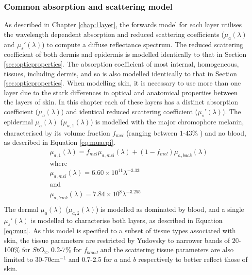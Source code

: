 \subsubsection{Common absorption and scattering model}\label{sec:opticproperties2}
As described in Chapter \ref{chap:1layer}, the forwards model for each layer utilises the wavelength dependent absorption and reduced scattering coefficients ($\mu_a(\lambda)$ and $\mu_s'(\lambda)$) to compute a diffuse reflectance spectrum. 
The reduced scattering coefficient of both dermis and epidermis is modelled identically to that in Section \ref{sec:opticproperties}. The absorption coefficient of most internal, homogeneous, tissues, including dermis, and so is also modelled identically to that in Section \ref{sec:opticproperties}. When modelling skin, it is necessary to use more than one layer due to the stark differences in optical and anatomical properties between the layers of skin\cite{Mignon2018}. In this chapter each of these layers has a distinct absorption coefficient ($\mu_a(\lambda)$) and identical reduced scattering coefficient ($\mu_s'(\lambda)$). The epidermal $\mu_a(\lambda)$ ($\mu_{a, 1}(\lambda)$) is modelled with the major chromophore melanin, characterised by its volume fraction $f_{mel}$ (ranging between 1-43\% \cite{Yudovsky2009}) and no blood, as described in Equation \ref{eq:muaepi}. 
\begin{equation}
\begin{aligned}
    & \mu_{a, 1}(\lambda) = f_{mel}\mu_{a, mel}(\lambda) + (1-f_{mel})\mu_{a, back}(\lambda) \\
    & \textrm{where}\\
    & \mu_{a, mel}(\lambda) = 6.60\times10^{11}\lambda^{-3.33}\\
    & \textrm{and}\\
    & \mu_{a, back}(\lambda) = 7.84\times10^8\lambda^{-3.255}\\
\end{aligned}
\label{eq:muaepi}
\end{equation}
The dermal $\mu_a(\lambda)$ ($\mu_{a, 2}(\lambda)$) is modelled as dominated by blood, and a single $\mu_s'(\lambda)$ is modelled to characterise both layers, as described in Equation \ref{eq:mua}. As this model is specified to a subset of tissue types associated with skin, the tissue parameters are restricted by Yudovsky to narrower bands of 20-100\% for $StO_2$, 0.2-7\% for $f_{blood}$\cite{Yudovsky2011a} and the scattering tissue parameters are also limited to 30-70cm$^{-1}$ and 0.7-2.5 for $a$ and $b$ respectively to better reflect those of skin\cite{Jacques2013}. 

